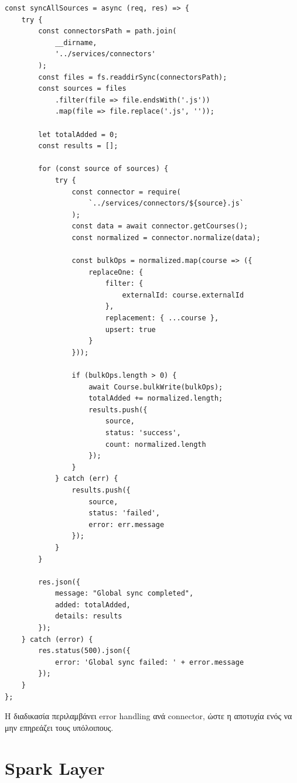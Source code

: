\documentclass[a4paper,12pt]{article}
\begin{document}
\begin{verbatim}
const syncAllSources = async (req, res) => {
    try {
        const connectorsPath = path.join(
            __dirname, 
            '../services/connectors'
        );
        const files = fs.readdirSync(connectorsPath);
        const sources = files
            .filter(file => file.endsWith('.js'))
            .map(file => file.replace('.js', ''));

        let totalAdded = 0;
        const results = [];

        for (const source of sources) {
            try {
                const connector = require(
                    `../services/connectors/${source}.js`
                );
                const data = await connector.getCourses();
                const normalized = connector.normalize(data);

                const bulkOps = normalized.map(course => ({
                    replaceOne: {
                        filter: { 
                            externalId: course.externalId 
                        },
                        replacement: { ...course },
                        upsert: true
                    }
                }));

                if (bulkOps.length > 0) {
                    await Course.bulkWrite(bulkOps);
                    totalAdded += normalized.length;
                    results.push({ 
                        source, 
                        status: 'success', 
                        count: normalized.length 
                    });
                }
            } catch (err) {
                results.push({ 
                    source, 
                    status: 'failed', 
                    error: err.message 
                });
            }
        }

        res.json({ 
            message: "Global sync completed", 
            added: totalAdded,
            details: results 
        });
    } catch (error) {
        res.status(500).json({ 
            error: 'Global sync failed: ' + error.message 
        });
    }
};
\end{verbatim}

Η διαδικασία περιλαμβάνει error handling ανά connector, ώστε η αποτυχία ενός να μην επηρεάζει τους υπόλοιπους.




\section{Spark Layer}
\end{document}
